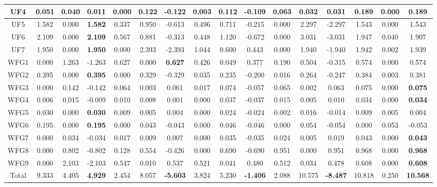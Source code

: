 \begin{table}[H]
{\begin{tabular}{|c|c|c|c|c|c|c|c|c|c|c|c|c|c|c|c|}
UF4 & 0.051 & 0.040 & 0.011 & 0.000 & 0.122 & -0.122 & 0.003 & 0.112 & -0.109 & 0.063 & 0.032 & 0.031 & 0.189 & 0.000 & \textbf{0.189} \\ \hline
UF5 & 1.582 & 0.000 & \textbf{1.582} & 0.337 & 0.950 & -0.613 & 0.496 & 0.711 & -0.215 & 0.000 & 2.297 & -2.297 & 1.543 & 0.000 & 1.543 \\ \hline
UF6 & 2.109 & 0.000 & \textbf{2.109} & 0.567 & 0.881 & -0.313 & 0.448 & 1.120 & -0.672 & 0.000 & 3.031 & -3.031 & 1.947 & 0.040 & 1.907 \\ \hline
UF7 & 1.950 & 0.000 & \textbf{1.950} & 0.000 & 2.393 & -2.393 & 1.044 & 0.600 & 0.443 & 0.000 & 1.940 & -1.940 & 1.942 & 0.002 & 1.939 \\ \hline
WFG1 & 0.000 & 1.263 & -1.263 & 0.627 & 0.000 & \textbf{0.627} & 0.426 & 0.049 & 0.377 & 0.190 & 0.504 & -0.315 & 0.574 & 0.000 & 0.574 \\ \hline
WFG2 & 0.395 & 0.000 & \textbf{0.395} & 0.000 & 0.329 & -0.329 & 0.035 & 0.235 & -0.200 & 0.016 & 0.264 & -0.247 & 0.384 & 0.003 & 0.381 \\ \hline
WFG3 & 0.000 & 0.142 & -0.142 & 0.064 & 0.003 & 0.061 & 0.017 & 0.074 & -0.057 & 0.065 & 0.002 & 0.063 & 0.075 & 0.000 & \textbf{0.075} \\ \hline
WFG4 & 0.006 & 0.015 & -0.009 & 0.010 & 0.008 & 0.001 & 0.000 & 0.037 & -0.037 & 0.015 & 0.005 & 0.010 & 0.034 & 0.000 & \textbf{0.034} \\ \hline
WFG5 & 0.030 & 0.000 & \textbf{0.030} & 0.009 & 0.005 & 0.004 & 0.000 & 0.024 & -0.024 & 0.002 & 0.016 & -0.014 & 0.009 & 0.005 & 0.004 \\ \hline
WFG6 & 0.195 & 0.000 & \textbf{0.195} & 0.000 & 0.043 & -0.043 & 0.000 & 0.046 & -0.046 & 0.000 & 0.054 & -0.054 & 0.000 & 0.053 & -0.053 \\ \hline
WFG7 & 0.000 & 0.034 & -0.034 & 0.017 & 0.009 & 0.007 & 0.000 & 0.035 & -0.035 & 0.024 & 0.005 & 0.019 & 0.043 & 0.000 & \textbf{0.043} \\ \hline
WFG8 & 0.000 & 0.802 & -0.802 & 0.128 & 0.554 & -0.426 & 0.000 & 0.690 & -0.690 & 0.951 & 0.000 & 0.951 & 0.968 & 0.000 & \textbf{0.968} \\ \hline
WFG9 & 0.000 & 2.103 & -2.103 & 0.547 & 0.010 & 0.537 & 0.521 & 0.041 & 0.480 & 0.512 & 0.034 & 0.478 & 0.608 & 0.000 & \textbf{0.608} \\ \hline
Total & 9.333 & 4.405 & \textbf{4.929} & 2.454 & 8.057 & \textbf{-5.603} & 3.824 & 5.230 & \textbf{-1.406} & 2.088 & 10.575 & \textbf{-8.487} & 10.818 & 0.250 & \textbf{10.568} \\ \hline
\end{tabular}%
}
\end{table}

